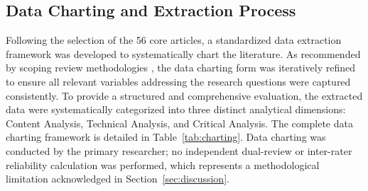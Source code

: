 \documentclass[10pt,letterpaper]{article}
\begin{document}
\begin{figure}[H]
\end{figure}

\subsection{Data Charting and Extraction Process}

Following the selection of the 56 core articles, a standardized data extraction framework was developed to systematically chart the literature. As recommended by scoping review methodologies \cite{tricco2018}, the data charting form was iteratively refined to ensure all relevant variables addressing the research questions were captured consistently. To provide a structured and comprehensive evaluation, the extracted data were systematically categorized into three distinct analytical dimensions: Content Analysis, Technical Analysis, and Critical Analysis. The complete data charting framework is detailed in Table~\ref{tab:charting}. Data charting was conducted by the primary researcher; no independent dual-review or inter-rater reliability calculation was performed, which represents a methodological limitation acknowledged in Section~\ref{sec:discussion}.
\end{document}
